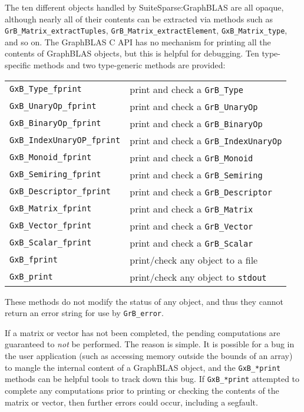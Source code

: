 \documentclass[12pt]{article}
\begin{document}
The ten different objects handled by SuiteSparse:GraphBLAS are all opaque,
although nearly all of their contents can be extracted via methods such as
\verb'GrB_Matrix_extractTuples', \verb'GrB_Matrix_extractElement',
\verb'GxB_Matrix_type', and so on.  The GraphBLAS C API has no mechanism for
printing all the contents of GraphBLAS objects, but this is helpful for
debugging.  Ten type-specific methods and two type-generic methods are
provided:

\vspace{0.2in}
{\footnotesize
\begin{tabular}{ll}
\hline
\verb'GxB_Type_fprint'         & print and check a \verb'GrB_Type' \\
\verb'GxB_UnaryOp_fprint'      & print and check a \verb'GrB_UnaryOp' \\
\verb'GxB_BinaryOp_fprint'     & print and check a \verb'GrB_BinaryOp' \\
\verb'GxB_IndexUnaryOP_fprint' & print and check a \verb'GrB_IndexUnaryOp' \\
\verb'GxB_Monoid_fprint'       & print and check a \verb'GrB_Monoid' \\
\verb'GxB_Semiring_fprint'     & print and check a \verb'GrB_Semiring' \\
\verb'GxB_Descriptor_fprint'   & print and check a \verb'GrB_Descriptor' \\
\verb'GxB_Matrix_fprint'       & print and check a \verb'GrB_Matrix' \\
\verb'GxB_Vector_fprint'       & print and check a \verb'GrB_Vector' \\
\verb'GxB_Scalar_fprint'       & print and check a \verb'GrB_Scalar' \\
\hline
\verb'GxB_fprint'             & print/check any object to a file \\
\verb'GxB_print'              & print/check any object to \verb'stdout' \\
\hline
\end{tabular}
}
\vspace{0.2in}

These methods do not modify the status of any object, and thus they
cannot return an error string for use by \verb'GrB_error'.

If a matrix or vector
has not been completed, the pending computations are guaranteed to {\em not} be
performed. The reason is simple.  It is possible for a bug in the user
application (such as accessing memory outside the bounds of an array) to mangle
the internal content of a GraphBLAS object, and the \verb'GxB_*print' methods
can be helpful tools to track down this bug.  If \verb'GxB_*print' attempted to
complete any computations prior to printing or checking the contents of the
matrix or vector, then further errors could occur, including a segfault.
\end{document}
